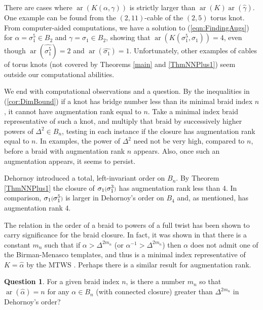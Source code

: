 \documentclass[11pt]{amsart}
\def\s{{\sigma}}
\def\ar{\operatorname{ar}}
\newcommand*{\smallp}[1]{\scalebox{.75}{\ensuremath#1}}
\theoremstyle{definition}
\begin{document}
There are cases where $\ar(K(\alpha,\gamma))$ is strictly larger than $\ar(K)\ar(\hat{\gamma})$. One example can be found from the $(2,11)$-cable of the $(2,5)$ torus knot. From computer-aided computations, we have a solution to (\ref{eqn:FindingAugs}) for $\alpha = \s_1^5\in B_2$ and $\gamma=\s_1\in B_2$, showing that $\ar(K(\s_1^5,\s_1)) = 4$, even though $\ar(\hat{\s_1^5})=2$ and $\ar(\hat{\s_1})=1$. Unfortunately, other examples of cables of torus knots (not covered by Theorems \ref{main} and \ref{ThmNNPlus1}) seem outside our computational abilities.

We end with computational observations and a question. By the inequalities in (\ref{cor:DimBound}) if a knot has bridge number less than its minimal braid index $n$, it cannot have augmentation rank equal to $n$. Take a minimal index braid representative of such a knot, and multiply that braid by successively higher powers of $\Delta^2\in B_n$, testing in each instance if the closure has augmentation rank equal to $n$. In examples, the power of $\Delta^2$ need not be very high, compared to $n$, before a braid with augmentation rank $n$ appears. Also, once such an augmentation appears, it seems to persist. 

Dehornoy introduced a total, left-invariant order on $B_n$. By Theorem \ref{ThmNNPlus1} the closure of $\s_1\smallp(\s_1^3\smallp)$ has augmentation rank less than 4. In comparison, $\s_1\smallp(\s_1^5\smallp)$ is larger in Dehornoy's order on $B_4$ and, as mentioned, has augmentation rank 4. 

The relation in the order of a braid to powers of a full twist has been shown to carry significance for the braid closure. In fact, it was shown in \cite{MN} that there is a constant $m_n$ such that if $\alpha>\Delta^{2m_n}$ (or $\alpha^{-1}>\Delta^{2m_n}$) then $\alpha$ does not admit one of the Birman-Menasco templates, and thus is a minimal index representative of $K=\hat\alpha$ by the MTWS \cite{BM_MTWS}. Perhaps there is a similar result for augmentation rank.

\newtheorem*{ques}{Question}
\begin{ques}For a given braid index $n$, is there a number $m_n$ so that $\ar(\hat\alpha)=n$ for any $\alpha\in B_n$ (with connected closure) greater than $\Delta^{2m_n}$ in Dehornoy's order?
\end{ques}



\end{document}
